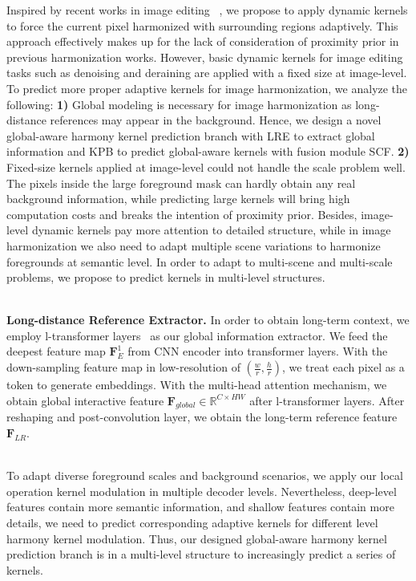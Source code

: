 \documentclass[10pt,twocolumn,letterpaper]{article}
\begin{document}
Inspired by recent works in image editing ~\cite{bako2017kernel,guo2021efficientderain,mildenhall2018burst}, we propose to apply dynamic kernels to force the current pixel harmonized with surrounding regions adaptively. This approach effectively makes up for the lack of consideration of proximity prior in previous harmonization works.
However, basic dynamic kernels for image editing tasks such as denoising and deraining are applied with a fixed size at image-level. To predict more proper adaptive kernels for image harmonization, we analyze the following: \textbf{1)} Global modeling is necessary for image harmonization as long-distance references may appear in the background. Hence, we design a novel global-aware harmony kernel prediction branch with LRE to extract global information and KPB to predict global-aware kernels with fusion module SCF. \textbf{2)} Fixed-size kernels applied at image-level could not handle the scale problem well. \eg The pixels inside the large foreground mask can hardly obtain any real background information, while predicting large kernels will bring high computation costs and breaks the intention of proximity prior. Besides, image-level dynamic kernels pay more attention to detailed structure, while in image harmonization we also need to adapt multiple scene variations to harmonize foregrounds at semantic level. In order to adapt to multi-scene and multi-scale problems, we propose to predict kernels in multi-level structures.

~\\
\noindent \textbf{Long-distance Reference Extractor.}
In order to obtain long-term context, we employ l-transformer layers~\cite{dosovitskiy2020image} as our global information extractor. We feed the deepest feature map $\mathbf{F}_E^1$ from CNN encoder into transformer layers. With the down-sampling feature map in low-resolution of $(\frac{w}{r},\frac{h}{r})$, we treat each pixel as a token to generate embeddings. With the multi-head attention mechanism, we obtain global interactive feature $\mathbf{F}_{global} \in \mathbb{R}^{C \times HW}$ after l-transformer layers. After reshaping and post-convolution layer, we obtain the long-term reference feature $\mathbf{F}_{LR}$.

~\\
To adapt diverse foreground scales and background scenarios, we apply our local operation kernel modulation in multiple decoder levels. Nevertheless, deep-level features contain more semantic information, and shallow features contain more details, we need to predict corresponding adaptive kernels for different level harmony kernel modulation. Thus, our designed global-aware harmony kernel prediction branch is in a multi-level structure to increasingly predict a series of kernels.
\end{document}
